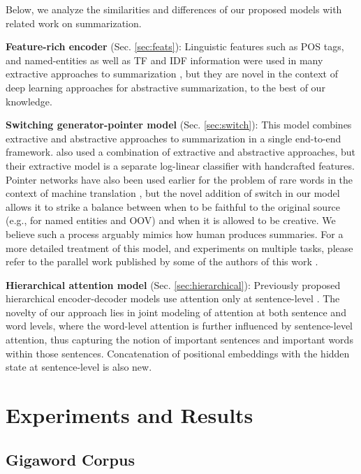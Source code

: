 Below, we analyze the similarities and differences of our proposed models with related work on summarization.

{\bf Feature-rich encoder} (Sec. \ref{sec:feats}): Linguistic features such as POS tags, and named-entities as well as TF and IDF information were used in many extractive approaches to summarization \cite{linguistic_extractive}, but they are novel in the context of deep learning approaches for abstractive summarization, to the best of our knowledge.

{\bf Switching generator-pointer model} (Sec. \ref{sec:switch}): This model combines extractive and abstractive approaches to summarization in a single end-to-end framework.  also used a combination of extractive and abstractive approaches, but their extractive model is a separate log-linear classifier with handcrafted features. Pointer networks \cite{pointer_networks} have also been used earlier for the problem of rare words in the context of machine translation \cite{luongACL15}, but the novel addition of switch in our model allows it to strike a balance between when to be faithful to the original source (e.g., for named entities and OOV) and when it is allowed to be creative. We believe such a process arguably mimics how human produces summaries. For a more detailed treatment of this model, and experiments on multiple tasks, please refer to the parallel work published by some of the authors of this work \cite{caglar_acl}.

{\bf Hierarchical attention model} (Sec. \ref{sec:hierarchical}): Previously proposed hierarchical encoder-decoder models use attention only at sentence-level \cite{hiero_encdec}. The novelty of our approach lies in joint modeling of attention at both sentence and word levels, where the word-level attention is further influenced by sentence-level attention, thus capturing the notion of important sentences and important words within those sentences. Concatenation of positional embeddings with the hidden state at sentence-level is also new.

\section{Experiments and Results}\label{sec:exp}

\subsection{Gigaword Corpus}


